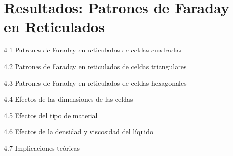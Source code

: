 \chapter{Resultados: Patrones de Faraday en Reticulados}

4.1 Patrones de Faraday en reticulados de celdas cuadradas

4.2 Patrones de Faraday en reticulados de celdas triangulares

4.3 Patrones de Faraday en reticulados de celdas hexagonales

4.4 Efectos de las dimensiones de las celdas

4.5 Efectos del tipo de material

4.6 Efectos de la densidad y viscosidad del líquido

4.7 Implicaciones teóricas

